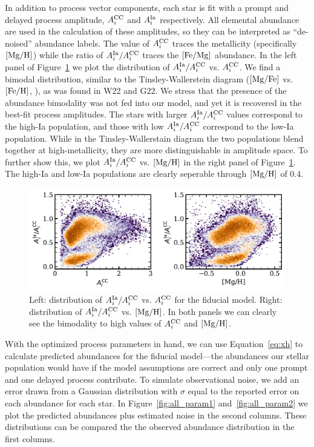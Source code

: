 \documentclass[modern]{aastex631}
\newcommand{\mgfe}[0]{[{\rm Mg/Fe}]}
\newcommand{\femg}{[{\rm Fe}/{\rm Mg}]}
\newcommand{\mgh}{[{\rm Mg}/{\rm H}]}
\newcommand{\feh}[0]{[{\rm Fe/H}]}
\newcommand{\Acc}{A^{\rm CC}_{i}}
\newcommand{\AIa}{A^{\rm Ia}_{i}}
\begin{document}
In addition to process vector components, each star is fit with a prompt and delayed process amplitude, $\Acc$ and $\AIa$ respectively. All elemental abundance are used in the calculation of these amplitudes, so they can be interpreted as ``de-noised'' abundance labels. The value of $\Acc$ traces the metallicity (specifically $\mgh$) while the ratio of $\AIa/\Acc$ traces the $\femg$ abundance. In the left panel of Figure~\ref{fig:As} we plot the distribution of $\AIa/\Acc$ vs. $\Acc$. We find a bimodal distribution, similar to the Tinsley-Wallerstein diagram ($\mgfe$ vs. $\feh$, \citealp{wallerstein1962, tinsley1979, tinsley1980}), as was found in W22 and G22. We stress that the presence of the abundance bimodality was not fed into our model, and yet it is recovered in the best-fit process amplitudes. The stars with larger $\AIa/\Acc$ values correspond to the high-Ia population, and those with low $\AIa/\Acc$ correspond to the low-Ia population. While in the Tinsley-Wallerstain diagram the two populations blend together at high-metallicity, they are more distinguishable in amplitude space. To further show this, we plot $\AIa/\Acc$ vs. $\mgh$ in the right panel of Figure~\ref{fig:As}. The high-Ia and low-Ia populations are clearly seperable through $\mgh$ of 0.4.

\begin{figure}[htb!]
    \centering
    \includegraphics[width=.9\textwidth]{Paper/Figures/As.pdf}
    \caption{Left: distribution of $\AIa/\Acc$ vs. $\Acc$ for the fiducial model. Right: distribution of $\AIa/\Acc$ vs. $\mgh$. In both panels we can clearly see the bimodality to high values of $\Acc$ and $\mgh$.}
    \label{fig:As}
\end{figure}

With the optimized process parameters in hand, we can use Equation~\ref{eq:xh} to calculate predicted abundances for the fiducial model---the abundances our stellar population would have if the model assumptions are correct and only one prompt and one delayed process contribute. To simulate observational noise, we add an error drawn from a Gaussian distribution with $\sigma$ equal to the reported error on each abundance for each star. In Figure~\ref{fig:all_param1} and~\ref{fig:all_param2} we plot the predicted abundances plus estimated noise in the second columns. These distributions can be compared the the observed abundance distribution in the first columns.
\end{document}
